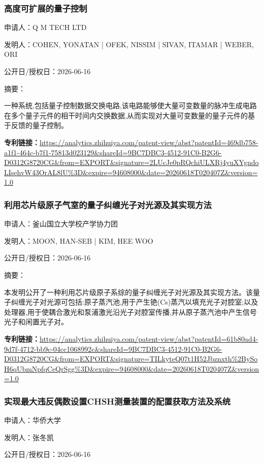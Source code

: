 \documentclass[12pt,a4paper]{ctexart}
\begin{document}
\subsubsection{ 高度可扩展的量子控制 }

申请人：Q M TECH LTD

发明人：COHEN, YONATAN | OFEK, NISSIM | SIVAN, ITAMAR | WEBER, ORI

公开日/授权日：2026-06-16

摘要：

一种系统,包括量子控制数据交换电路,该电路能够使大量可变数量的脉冲生成电路在多个量子元件的相干时间内交换数据,从而实现对大量可变数量的量子元件的基于反馈的量子控制。

\noindent\textbf{专利链接：}\url{https://analytics.zhihuiya.com/patent-view/abst?patentId=469db758-a1f1-464c-b7f1-75813d023129&shareId=9BC7DBC3-4512-91C0-B2G6-D0312G8720CG&from=EXPORT&signature=2LUcJe0pRQchiULXRj4yuXYgndoLIsehvW43OrAL8lU%3D&expire=94608000&date=20260618T020407Z&version=1.0}

\subsubsection{ 利用芯片级原子气室的量子纠缠光子对光源及其实现方法 }

申请人：釜山国立大学校产学协力团

发明人：MOON, HAN-SEB | KIM, HEE WOO

公开日/授权日：2026-06-16

摘要：

本发明公开了一种利用芯片级原子系综的量子纠缠光子对光源及其实现方法。该量子纠缠光子对光源可包括:原子蒸汽池,用于产生铯(Cs)蒸汽以填充光子对腔室;以及处理器,用于使耦合激光和泵浦激光沿光子对腔室传播,并从原子蒸汽池中产生信号光子和闲置光子对。

\noindent\textbf{专利链接：}\url{https://analytics.zhihuiya.com/patent-view/abst?patentId=61b80ad4-9d7f-4712-bb9c-04cc1068992c&shareId=9BC7DBC3-4512-91C0-B2G6-D0312G8720CG&from=EXPORT&signature=TILkyteQ07t1H52Jbznxth%2BySoH6qUbmNpfqCeQrSgg%3D&expire=94608000&date=20260618T020407Z&version=1.0}

\subsubsection{ 实现最大违反偶数设置CHSH测量装置的配置获取方法及系统 }

申请人：华侨大学

发明人：张冬凯

公开日/授权日：2026-06-16
\end{document}
